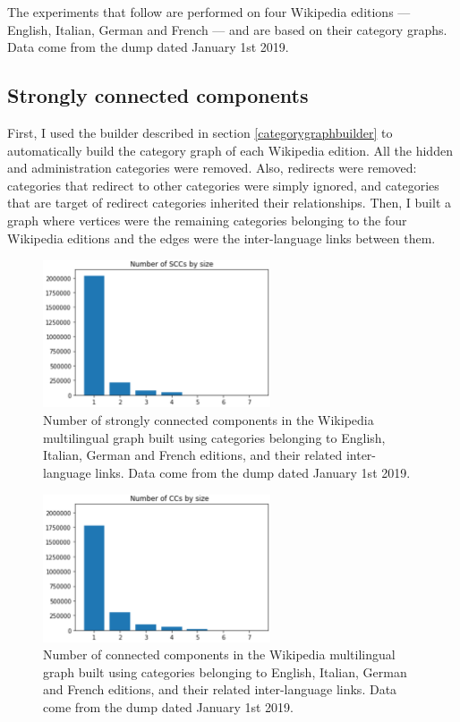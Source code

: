         The experiments that follow are performed on four Wikipedia editions --- English, Italian, German and French --- and are based on their category graphs. Data come from the dump dated January 1st 2019.
        
        \subsection{Strongly connected components}
            First, I used the builder described in section \ref{categorygraphbuilder} to automatically build the category graph of each Wikipedia edition. All the hidden and administration categories were removed. Also, redirects were removed: categories that redirect to other categories were simply ignored, and categories that are target of redirect categories inherited their relationships. Then, I built a graph where vertices were the remaining categories belonging to the four Wikipedia editions and the edges were the inter-language links between them.
        
            \begin{figure}
                \centering
                \includegraphics[width=0.6\textwidth]{images/scc_by_size.PNG}
                \caption{Number of strongly connected components in the Wikipedia multilingual graph built using categories belonging to English, Italian, German and French editions, and their related inter-language links. Data come from the dump dated January 1st 2019.}
                \label{scc_by_size}
            \end{figure}
            
            \begin{figure}
                \centering
                \includegraphics[width=0.6\textwidth]{images/cc_by_size.PNG}
                \caption{Number of connected components in the Wikipedia multilingual graph built using categories belonging to English, Italian, German and French editions, and their related inter-language links. Data come from the dump dated January 1st 2019.}
                \label{cc_by_size}
            \end{figure}
        
